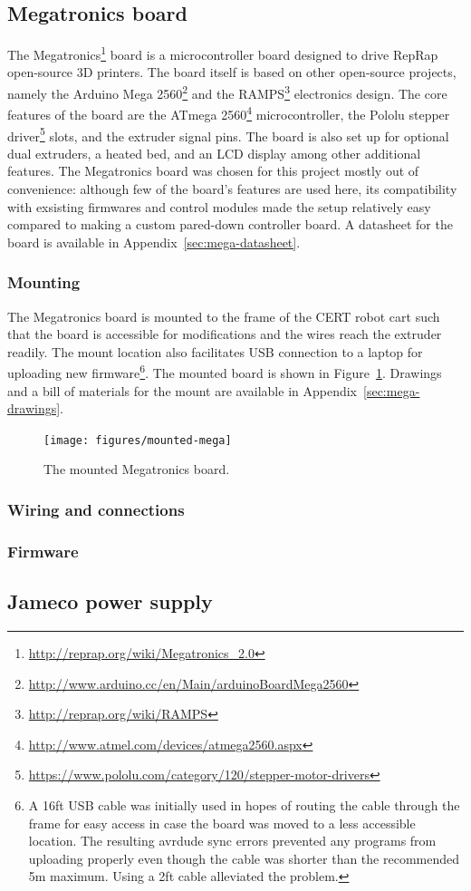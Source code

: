 \subsection{Megatronics board}
The Megatronics\footnote{\url{http://reprap.org/wiki/Megatronics_2.0}} board is a microcontroller board designed to drive RepRap open-source 3D printers. The board itself is based on other open-source projects, namely the Arduino Mega 2560\footnote{\url{http://www.arduino.cc/en/Main/arduinoBoardMega2560}} and the RAMPS\footnote{\url{http://reprap.org/wiki/RAMPS}} electronics design. The core features of the board are the ATmega 2560\footnote{\url{http://www.atmel.com/devices/atmega2560.aspx}} microcontroller, the Pololu stepper driver\footnote{\url{https://www.pololu.com/category/120/stepper-motor-drivers}} slots, and the extruder signal pins. The board is also set up for optional dual extruders, a heated bed, and an LCD display among other additional features. The Megatronics board was chosen for this project mostly out of convenience: although few of the board's features are used here, its compatibility with exsisting firmwares and control modules made the setup relatively easy compared to making a custom pared-down controller board. A datasheet for the board is available in Appendix~\ref{sec:mega-datasheet}.

\subsubsection{Mounting}
The Megatronics board is mounted to the frame of the CERT robot cart such that the board is accessible for modifications and the wires reach the extruder readily. The mount location also facilitates USB connection to a laptop for uploading new firmware\footnote{A 16ft USB cable was initially used in hopes of routing the cable through the frame for easy access in case the board was moved to a less accessible location. The resulting avrdude sync errors prevented any programs from uploading properly even though the cable was shorter than the recommended 5m maximum. Using a 2ft cable alleviated the problem.}. The mounted board is shown in Figure~\ref{fig:mounted-mega}. Drawings and a bill of materials for the mount are available in Appendix~\ref{sec:mega-drawings}.

\begin{figure}
    \centering
    \texttt{[image: figures/mounted-mega]}
    \caption{The mounted Megatronics board.}
    \label{fig:mounted-mega}
\end{figure}

\subsubsection{Wiring and connections}
\subsubsection{Firmware}

\subsection{Jameco power supply}
